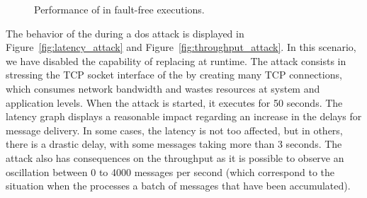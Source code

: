 \begin{figure}[t]

\hspace{-5mm}
\caption{Performance of \sieveq in fault-free executions.}
\end{figure}




The behavior of the \sieveq during a \gls{dos} attack is displayed in Figure~\ref{fig:latency_attack} and Figure~\ref{fig:throughput_attack}.
In this scenario, we have disabled the \sieveq capability of replacing \presieves at runtime.
The attack consists in stressing the TCP socket interface of the \presieves by creating many TCP connections, which consumes network bandwidth and wastes resources at system and application levels. When the attack is started, it executes for 50 seconds. The latency graph displays a reasonable impact regarding an increase in the delays for message delivery. 
In some cases, the latency is not too affected, but in others, there is a drastic delay, with some messages taking more than 3 seconds.
The attack also has consequences on the throughput as it is possible to observe an oscillation between 0 to 4000 messages per second (which correspond to the situation when the \postsieve processes a batch of messages that have been accumulated).


